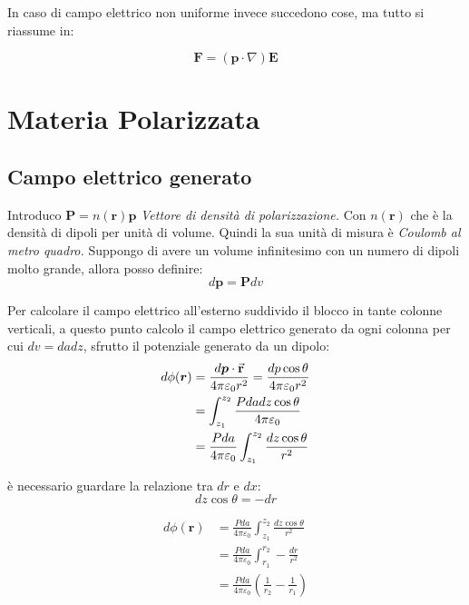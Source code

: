 \documentclass[a4paper]{scrarticle}
\begin{document}
In caso di campo elettrico non uniforme invece succedono cose, ma tutto si riassume in:

\begin{equation*}
    \bm F = (\bm p \cdot \nabla)\bm E
\end{equation*}

\section{Materia Polarizzata}

\subsection{Campo elettrico generato}

Introduco $\bm P = n(\bm r)\bm p$ \emph{Vettore di densità di polarizzazione.}
Con $n(\bm r)$ che è la densità di dipoli per unità di volume.
Quindi la sua unità di misura è \emph{Coulomb al metro quadro.}
Suppongo di avere un volume infinitesimo con un numero di dipoli molto grande, allora posso definire:
\begin{equation*}
    d\bm p = \bm P dv
\end{equation*}

Per calcolare il campo elettrico all'esterno suddivido il blocco in tante colonne verticali, a questo punto calcolo il campo elettrico generato da ogni colonna per cui $dv = da dz$, sfrutto il potenziale generato da un dipolo:
\begin{align*}
    d\phi(\bm r) &= \frac{d\bm p \cdot \va r}{4\pi\varepsilon_0r^2}= \frac{dp\cos\theta}{4\pi\varepsilon_0r^2}\\
    &= \int_{z_1}^{z_2}\frac{Pdadz\cos \theta}{4\pi\varepsilon_0}\\
    &= \frac{Pda}{4\pi\varepsilon_0}\int_{z_1}^{z_2}\frac{dz \cos \theta}{r^2}
\end{align*}

è necessario guardare la relazione tra $dr$ e $dx$:
\begin{equation*}
    dz \cos \theta = -dr
\end{equation*}

\begin{align*}
    d\phi(\bm r) &= \frac{Pda}{4\pi\varepsilon_0} \int_{z_1}^{z_2}\frac{dz\cos\theta}{r^2}\\
    &= \frac{Pda}{4\pi\varepsilon_0} \int_{r_1}^{r_2} - \frac{dr}{r^2}\\
    &= \frac{Pda}{4\pi\varepsilon_0} (\frac{1}{r_2}- \frac{1}{r_1})
\end{align*}
\end{document}

